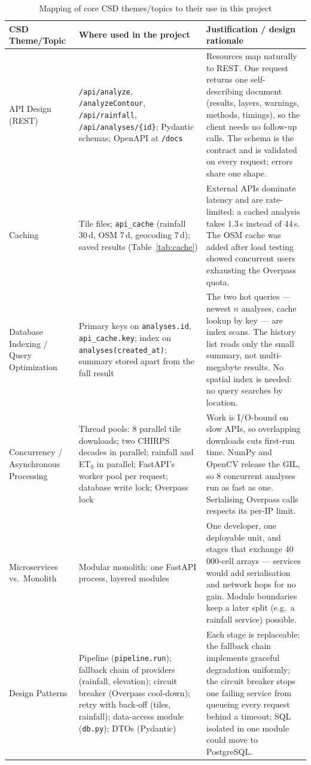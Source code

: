 \documentclass[manuscript,screen,review]{acmart}
\newcommand{\code}[1]{\texttt{\small #1}}
\begin{document}
\begin{table}[t]
  \caption{Mapping of core CSD themes/topics to their use in this project}
  \label{tab:csd-themes}
  \small
  \begin{tabularx}{\linewidth}{@{}P{2.5cm}P{4.6cm}Y@{}}
    \toprule
    CSD Theme/Topic & Where used in the project & Justification / design rationale \\
    \midrule
    API Design (REST) & \code{/api/analyze}, \code{/analyzeContour}, \code{/api/rainfall}, \code{/api/analyses/\{id\}}; Pydantic schemas; OpenAPI at \code{/docs} & Resources map naturally to REST. One request returns one self-describing document (results, layers, warnings, methods, timings), so the client needs no follow-up calls. The schema is the contract and is validated on every request; errors share one shape. \\
    Caching & Tile files; \code{api\_cache} (rainfall 30\,d, OSM 7\,d, geocoding 7\,d); saved results (Table~\ref{tab:cache}) & External APIs dominate latency and are rate-limited: a cached analysis takes 1.3\,s instead of 44\,s. The OSM cache was added after load testing showed concurrent users exhausting the Overpass quota. \\
    Database Indexing / Query Optimization & Primary keys on \code{analyses.id}, \code{api\_cache.key}; index on \code{analyses(created\_at)}; summary stored apart from the full result & The two hot queries --- newest $n$ analyses, cache lookup by key --- are index scans. The history list reads only the small summary, not multi-megabyte results. No spatial index is needed: no query searches by location. \\
    Concurrency / Asynchronous Processing & Thread pools: 8 parallel tile downloads; two CHIRPS decades in parallel; rainfall and ET$_0$ in parallel; FastAPI's worker pool per request; database write lock; Overpass lock & Work is I/O-bound on slow APIs, so overlapping downloads cuts first-run time. NumPy and OpenCV release the GIL, so 8 concurrent analyses run as fast as one. Serialising Overpass calls respects its per-IP limit. \\
    Microservices vs.\ Monolith & Modular monolith: one FastAPI process, layered modules & One developer, one deployable unit, and stages that exchange 40\,000-cell arrays --- services would add serialisation and network hops for no gain. Module boundaries keep a later split (e.g.\ a rainfall service) possible. \\
    Design Patterns & Pipeline (\code{pipeline.run}); fallback chain of providers (rainfall, elevation); circuit breaker (Overpass cool-down); retry with back-off (tiles, rainfall); data-access module (\code{db.py}); DTOs (Pydantic) & Each stage is replaceable; the fallback chain implements graceful degradation uniformly; the circuit breaker stops one failing service from queueing every request behind a timeout; SQL isolated in one module could move to PostgreSQL. \\

\end{tabularx}
\end{table}
\end{document}
